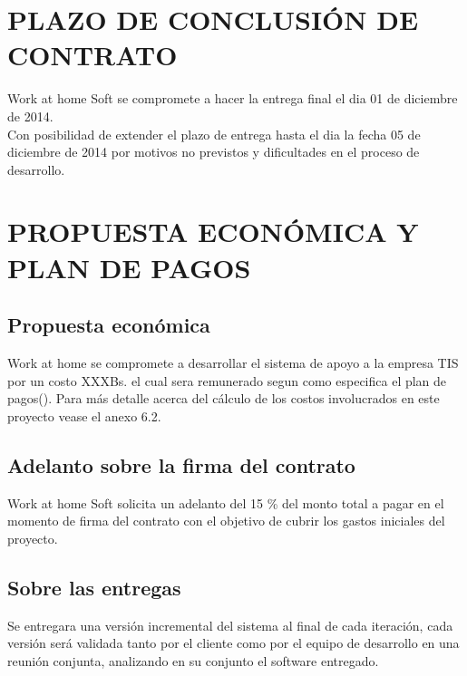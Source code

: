 \documentclass[11pt,letterpaper]{report}
\begin{document}
\chapter{PLAZO DE CONCLUSIÓN DE CONTRATO}
Work at home Soft se compromete a hacer la entrega final el dia 01 de diciembre de 2014.\\
Con posibilidad de extender el plazo de entrega hasta el dia la fecha 05 de diciembre de 2014 por motivos no previstos y dificultades en el proceso de desarrollo.

\chapter{PROPUESTA ECONÓMICA Y PLAN DE PAGOS}

\section{Propuesta económica}

Work at home se compromete a desarrollar el sistema de apoyo a la empresa TIS por un costo XXXBs. el cual sera remunerado segun como especifica el plan de pagos().
Para más detalle acerca del cálculo de los costos involucrados en este proyecto vease el anexo 6.2.

\section{Adelanto sobre la firma del contrato}

Work at home Soft solicita un adelanto del 15 \% del monto total a pagar en el momento de firma del contrato con el objetivo de cubrir los gastos iniciales del proyecto.

\section{Sobre las entregas}
Se entregara una versión incremental del sistema al final de cada iteración, cada versión será validada tanto por el cliente como por el equipo de desarrollo en una reunión conjunta, analizando en su conjunto el software entregado.
\end{document}
